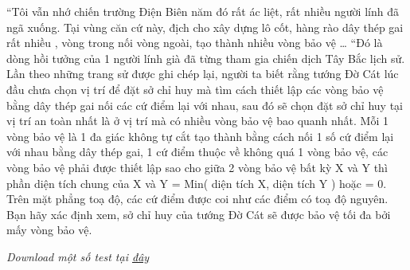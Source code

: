 “Tôi vẫn nhớ chiến trường Điện Biên năm đó rất ác liệt, rất nhiều người lính đã ngã xuống. Tại vùng căn cứ này, địch cho xây dựng lô cốt, hàng rào dây thép gai rất nhiều , vòng trong nối vòng ngoài, tạo thành nhiều vòng bảo vệ … “Đó là dòng hồi tưởng của 1 người lính già đã từng tham gia chiến dịch Tây Bắc lịch sử. Lần theo những trang sử được ghi chép lại, người ta biết rằng tướng Đờ Cát lúc đầu chưa chọn vị trí để đặt sở chỉ huy mà tìm cách thiết lập các vòng bảo vệ bằng dây thép gai nối các cứ điểm lại với nhau, sau đó sẽ chọn đặt sở chỉ huy tại vị trí an toàn nhất là ở vị trí mà có nhiều vòng bảo vệ bao quanh nhất. Mỗi 1 vòng bảo vệ là 1 đa giác không tự cắt tạo thành bằng cách nối 1 số cứ điểm lại với nhau bằng dây thép gai, 1 cứ điểm thuộc về không quá 1 vòng bảo vệ, các vòng bảo vệ phải được thiết lập sao cho giữa 2 vòng bảo vệ bất kỳ X và Y thì phần diện tích chung của X và Y = Min( diện tích X, diện tích Y ) hoặc = 0. Trên mặt phẳng toạ độ, các cứ điểm được coi như các điểm có toạ độ nguyên. Bạn hãy xác định xem, sở chỉ huy của tướng Đờ Cát sẽ được bảo vệ tối đa bởi mấy vòng bảo vệ.   





\textit{    Download một số test tại    \href{http://vn.spoj.pl/content/MILITARY.rar}{     đây    }}